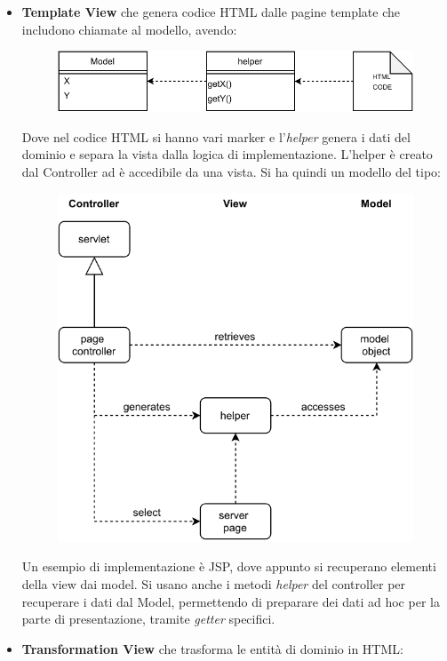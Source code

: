 \documentclass[a4paper,12pt, oneside]{book}
\begin{document}
\begin{itemize}
  \item \textbf{Template View} che genera codice HTML dalle pagine template
  che includono chiamate al modello, avendo:
  \begin{figure}[H]
    \centering
    \includegraphics[scale = 0.7]{img/mvc6.pdf}
  \end{figure}
  Dove nel codice HTML si hanno vari marker e l'\textit{helper} genera i dati
  del dominio e separa la vista dalla logica di implementazione. L'helper è
  creato dal Controller ad è accedibile da una vista. Si ha quindi un modello
  del tipo:
  \begin{figure}[H]
    \centering
    \includegraphics[scale = 0.7]{img/mvc7.pdf}
  \end{figure}
  Un esempio di implementazione è JSP, dove appunto si recuperano elementi della
  view dai model. Si usano anche i metodi \textit{helper} del controller per
  recuperare i dati dal Model, permettendo di preparare dei dati ad hoc per la
  parte di presentazione, tramite \textit{getter} specifici.
  \item \textbf{Transformation View} che trasforma le entità di dominio in HTML:

\end{itemize}
\end{document}
